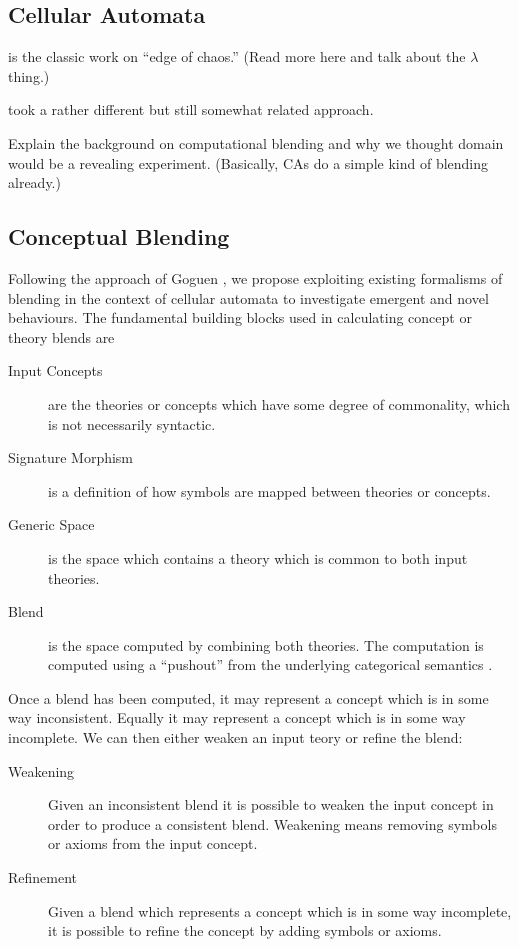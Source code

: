 \documentclass{AISB2008}
\begin{document}
\subsection{Cellular Automata}

\cite{mitchell1993revisiting} is the classic work on ``edge of
chaos.'' (Read more here and talk about the $\lambda$ thing.)

\cite{hofstadter1995prolegomena,marshall1999metacat} took a rather
different but still somewhat related approach.


Explain the background on computational blending and why we thought
domain would be a revealing experiment.  (Basically, CAs do a simple
kind of blending already.)

\subsection{Conceptual Blending}

Following the approach of Goguen \cite{}, we propose exploiting
existing formalisms of blending in the context of cellular automata to
investigate emergent and novel behaviours. The fundamental building blocks used in calculating concept or theory blends are
\begin{description}
\item[Input Concepts] are the theories or concepts which have some degree of commonality, which is not necessarily syntactic. 
\item[Signature Morphism] is a definition of how symbols are mapped between theories or concepts. 
\item[Generic Space] is the space which contains a theory which is common to both input theories.
\item[Blend] is the space computed by combining both theories. The computation is computed using a ``pushout'' from the underlying categorical semantics \cite{}. 
\end{description}

Once a blend has been computed, it may represent a concept which is in some way inconsistent. Equally it may represent a concept which is in some way incomplete. We can then either weaken an input teory or refine the blend:
\begin{description}
\item[Weakening] Given an inconsistent blend it is possible to weaken the input concept in order to produce a consistent blend. Weakening means removing symbols or axioms from the input concept.
\item[Refinement] Given a blend which represents a concept which is in some way incomplete, it is possible to refine the concept by adding symbols or axioms.
\end{description}
\end{document}
